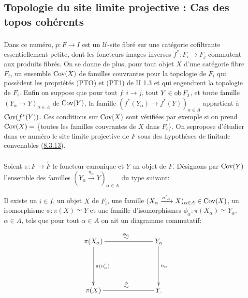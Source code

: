 \documentclass[10pt]{../fichiers-configuration-latex/smfart}
\begin{document}
\subsection{Topologie du site limite projective : Cas des topos
  cohérents}

\subsubsection{}

Dans ce numéro, $p : F \to I$ est un $𝒰$-site fibré sur une catégorie
cofiltrante essentiellement petite, dont les foncteurs images inverses
$f^{\ast} :F_i \to F_j$ commutent aux produits fibrés. On se donne de
plus, pour tout objet $X$ d'une catégorie fibre $F_i$, un ensemble
$\operatorname{Cov}(X)$ de familles couvrantes pour la topologie de $F_i$ qui possèdent les
propriétés (PTO) et (PT1) de II 1.3 et qui engendrent la topologie de
$F_i$. Enfin on suppose que pour tout $f : i \to j$, tout $Y \in \operatorname{ob}
F_j$, et toute famille $(Y_{\alpha} \to Y)_{\alpha \in A}$ de
$\operatorname{Cov}(Y)$, la famille $(f^{\ast}(Y_{\alpha}) \to f^{\ast} (Y))_{\alpha
  \in A}$ appartient à $\operatorname{Cov}(f^{\ast}(Y))$. Ces conditions sur $\operatorname{Cov}(X)$
sont vérifiées par exemple si on prend $\operatorname{Cov}(X) = $ \{toutes les
  familles couvrantes de $X$ dans $F_i$\}.
On se\pageoriginale propose d'étudier dans ce numéro le site limite
projective de $F$ sous des hypothèses de finitude convenables (\hyperref[VI.thm8.3.13]{8.3.13}).

\subsubsection{}

Soient $\pi : F \to \underrightarrow{F}$ le foncteur canonique et $Y$ un
objet de $\underrightarrow{F}$. Désignons par $\operatorname{Cov}(Y)$ l'ensemble des
familles $(Y_{\alpha} \xrightarrow{n_{\alpha}} Y)_{\alpha \in A}$ du
type suivant:

Il existe un $i \in I$, un objet $X$ de $F_i$, une famille
$(X_{\alpha} \xrightarrow{{n'}_\alpha} X)_{\alpha \in A} \in \operatorname{Cov}(X)$,
un isomorphisme $\phi : \pi(X) \simeq Y$ et une famille
d'isomorphismes $\phi_{\alpha} : \pi(X_{\alpha}) \simeq Y_{\alpha}$,
$\alpha \in A$, tels que pour tout $\alpha \in A$ on ait un diagramme
commutatif:
\[
\xymatrix@C=2.5cm@R=2cm{
\pi(X_{\alpha})
\ar@{-}[r]^{\displaystyle{\mathop{\sim}^{\phi_{\alpha}}}} \ar[d]^{\pi(n'_{\alpha})}& Y_{\alpha}\ar[d]^{n_{\alpha}} \\
\pi(X)  \ar@{-}[r]^{\displaystyle{\mathop{\sim}^{\phi}}} & Y .
}
\]
\end{document}
